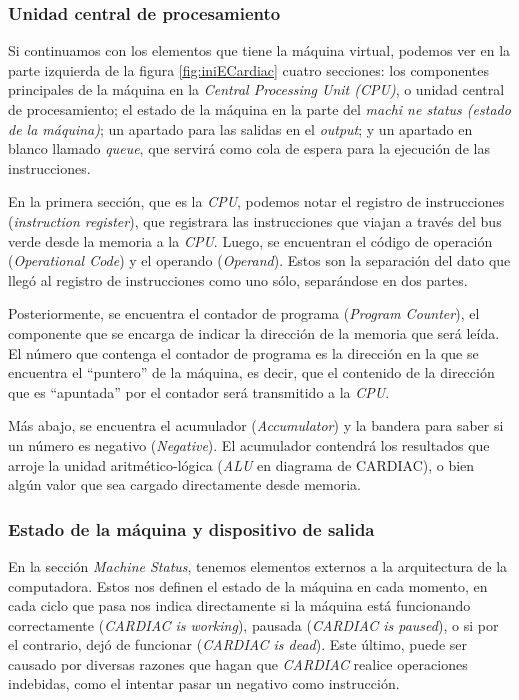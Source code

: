 \documentclass[letterpaper,12pt,oneside]{book}
\begin{document}
	
    \subsubsection{Unidad central de procesamiento}
    
	Si continuamos con los elementos que tiene la máquina virtual, podemos ver en la parte izquierda de la figura \ref{fig:iniECardiac}  cuatro secciones: los
	componentes principales de la máquina en la \textit{Central Processing Unit (CPU)}, o unidad central de procesamiento;
	 el estado de la máquina en la parte del \textit{machi ne status (estado de la máquina)}; un apartado para las salidas en el \textit{output}; y un apartado en 
	blanco llamado \textit{queue}, que servirá como cola de espera para la ejecución de las instrucciones.
 
    En la primera sección, que es la \textit{CPU}, podemos notar el
	registro de instrucciones (\textit{instruction register}), que registrara las instrucciones que viajan a través del bus verde desde la memoria a la \textit{CPU}. Luego, se encuentran el 
	código de operación (\textit{Operational Code}) y el operando (\textit{Operand}). Estos son la separación del dato que llegó al registro de 
	instrucciones como uno sólo, separándose en dos partes. 
 
    Posteriormente, se encuentra el contador de programa (\textit{Program Counter}), el componente que se 
	encarga de indicar la dirección de la memoria que será leída. El número que contenga el contador de programa es la dirección en la que se encuentra
	el ``puntero'' de la máquina, es decir, que el contenido de la dirección que es ``apuntada'' por el contador será transmitido a la \textit{CPU}.
 
    Más abajo, se
	encuentra el acumulador (\textit{Accumulator}) y la bandera para saber si un número es negativo (\textit{Negative}). El acumulador contendrá los resultados que arroje
	la unidad aritmético-lógica (\textit{ALU} en diagrama de CARDIAC), o bien algún valor que sea cargado directamente desde memoria.
	
	\subsubsection{Estado de la máquina y dispositivo de salida}                                         
	
	En la sección \textit{Machine Status}, tenemos elementos externos a la arquitectura de la computadora. Estos nos definen el
	estado de la máquina en cada momento, en cada ciclo que pasa nos indica directamente si la máquina está funcionando correctamente (\textit{CARDIAC is working}),
	pausada (\textit{CARDIAC is paused}), o si por el contrario, dejó de funcionar (\textit{CARDIAC is dead}). Este último, puede ser causado por diversas razones
	que hagan que \textit{CARDIAC} realice operaciones indebidas, como el intentar pasar un negativo como instrucción. 
	
\end{document}

